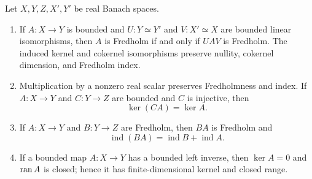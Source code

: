\begin{lemma}\label{lem:fredholm-calculus}
Let $X,Y,Z,X',Y'$ be real Banach spaces.
\begin{enumerate}
\item If $A:X\to Y$ is bounded and $U:Y\simeq Y'$ and $V:X'\simeq X$ are bounded linear
isomorphisms, then $A$ is Fredholm if and only if $UAV$ is Fredholm. The induced kernel and
cokernel isomorphisms preserve nullity, cokernel dimension, and Fredholm index.
\item Multiplication by a nonzero real scalar preserves Fredholmness and index. If
$A:X\to Y$ and $C:Y\to Z$ are bounded and $C$ is injective, then
\[
  \ker(CA)=\ker A.
\]
\item If $A:X\to Y$ and $B:Y\to Z$ are Fredholm, then $BA$ is Fredholm and
\[
  \operatorname{ind}(BA)=\operatorname{ind}B+\operatorname{ind}A.
\]
\item If a bounded map $A:X\to Y$ has a bounded left inverse, then $\ker A=0$ and $\operatorname{ran} A$ is
closed; hence it has finite-dimensional kernel and closed range.
\end{enumerate}
\leanok
\end{lemma}


